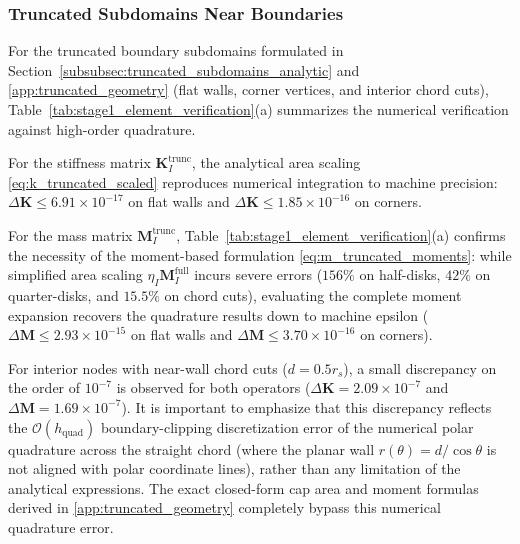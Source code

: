 \documentclass[preprint,12pt]{elsarticle}
\begin{document}
\subsubsection{Truncated Subdomains Near Boundaries}
For the truncated boundary subdomains formulated in Section~\ref{subsubsec:truncated_subdomains_analytic} and \ref{app:truncated_geometry} (flat walls, corner vertices, and interior chord cuts), Table~\ref{tab:stage1_element_verification}(a) summarizes the numerical verification against high-order quadrature.

For the stiffness matrix $\mathbf{K}_I^{\mathrm{trunc}}$, the analytical area scaling \eqref{eq:k_truncated_scaled} reproduces numerical integration to machine precision: $\Delta \mathbf{K} \le 6.91 \times 10^{-17}$ on flat walls and $\Delta \mathbf{K} \le 1.85 \times 10^{-16}$ on corners.

For the mass matrix $\mathbf{M}_I^{\mathrm{trunc}}$, Table~\ref{tab:stage1_element_verification}(a) confirms the necessity of the moment-based formulation \eqref{eq:m_truncated_moments}: while simplified area scaling $\eta_I \mathbf{M}_I^{\mathrm{full}}$ incurs severe errors ($156\%$ on half-disks, $42\%$ on quarter-disks, and $15.5\%$ on chord cuts), evaluating the complete moment expansion recovers the quadrature results down to machine epsilon ($\Delta \mathbf{M} \le 2.93 \times 10^{-15}$ on flat walls and $\Delta \mathbf{M} \le 3.70 \times 10^{-16}$ on corners).

For interior nodes with near-wall chord cuts ($d = 0.5 r_s$), a small discrepancy on the order of $10^{-7}$ is observed for both operators ($\Delta \mathbf{K} = 2.09 \times 10^{-7}$ and $\Delta \mathbf{M} = 1.69 \times 10^{-7}$). It is important to emphasize that this discrepancy reflects the $\mathcal{O}(h_{\mathrm{quad}})$ boundary-clipping discretization error of the numerical polar quadrature across the straight chord (where the planar wall $r(\theta) = d/\cos\theta$ is not aligned with polar coordinate lines), rather than any limitation of the analytical expressions. The exact closed-form cap area and moment formulas derived in \ref{app:truncated_geometry} completely bypass this numerical quadrature error.
\end{document}
